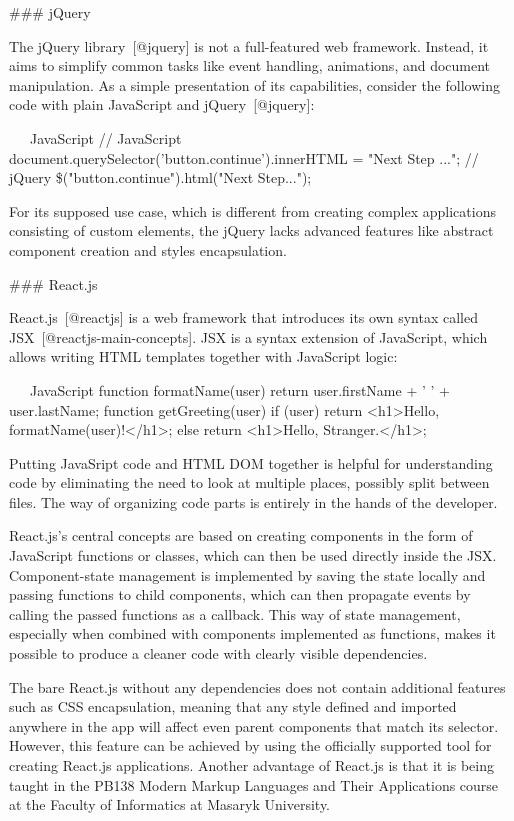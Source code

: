 \documentclass[
  digital, %
  oneside, %
  lof,     %
  nolot,     %
]{fithesis4}
\begin{document}
### jQuery

The jQuery library~[@jquery] is not a full-featured web framework. Instead, it aims to simplify common tasks like event handling, animations, and document manipulation. As a simple presentation of its capabilities, consider the following code with plain JavaScript and jQuery~[@jquery]:

~~~JavaScript
// JavaScript
document.querySelector('button.continue').innerHTML = "Next Step ...";
// jQuery
\$("button.continue").html("Next Step...");
~~~

For its supposed use case, which is different from creating complex applications consisting of custom elements, the jQuery lacks advanced features like abstract component creation and styles encapsulation.

### React.js

React.js~[@reactjs] is a web framework that introduces its own syntax called JSX~[@reactjs-main-concepts]. JSX is a syntax extension of JavaScript, which allows writing HTML templates together with JavaScript logic:

~~~JavaScript
function formatName(user) {
  return user.firstName + ' ' + user.lastName;
}
function getGreeting(user) {
  if (user) return <h1>Hello, {formatName(user)}!</h1>;
  else return <h1>Hello, Stranger.</h1>;
}
~~~

Putting JavaSript code and HTML DOM together is helpful for understanding code by eliminating the need to look at multiple places, possibly split between files. The way of organizing code parts is entirely in the hands of the developer.

React.js's central concepts are based on creating components in the form of JavaScript functions or classes, which can then be used directly inside the JSX. Component-state management is implemented by saving the state locally and passing functions to child components, which can then propagate events by calling the passed functions as a callback. This way of state management, especially when combined with components implemented as functions, makes it possible to produce a cleaner code with clearly visible dependencies.

The bare React.js without any dependencies does not contain additional features such as \acrshort{CSS} encapsulation, meaning that any style defined and imported anywhere in the app will affect even parent components that match its selector. However, this feature can be achieved by using the officially supported tool for creating React.js applications. Another advantage of React.js is that it is being taught in the PB138 Modern Markup Languages and Their Applications course at the Faculty of Informatics at Masaryk University.
\end{document}
